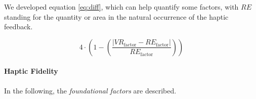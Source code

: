 We developed equation \ref{eq:diff}, which can help quantify some factors, with $RE$ standing for the quantity or area in the natural occurrence of the haptic feedback.

\begin{equation}    
4 \cdot \left(1 - \left(\frac{\left|VR_{\text{factor}} - RE_{\text{factor}}\right|}{RE_{\text{factor}}}\right)\right)
\label{eq:diff}
\end{equation}



\paragraph{Haptic Fidelity}
\label{sec:foundationallimiting}

In the following, the \textit{foundational factors} are described.

